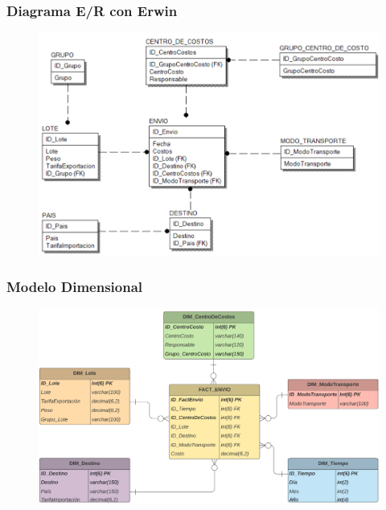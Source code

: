\documentclass[12pt,letterpaper]{article}
\begin{document}
\subsubsection{\textbf{Diagrama E/R con Erwin }}

	\begin{figure}[htb]
		\begin{center}
			\includegraphics[width=12cm]{./Imagenes/erwin_1}
			
		\end{center}
	\end{figure}

\newpage

\subsubsection{\textbf{Modelo Dimensional }}

	\begin{figure}[htb]
		\begin{center}
			\includegraphics[width=12.5cm]{./Imagenes/mod_dimensional_1}
			
		\end{center}
	\end{figure}
\end{document}
